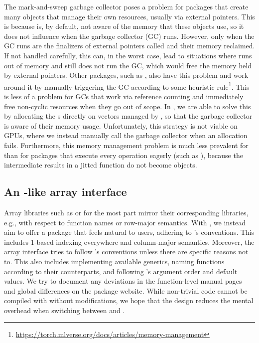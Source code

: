 \documentclass[article,shortnames]{jss}
\begin{document}
The mark-and-sweep  garbage collector poses a problem for  packages that create many objects that manage their own resources, usually via external pointers.
This is because  is, by default, not aware of the memory that these objects use, so it does not influence when the garbage collector (GC) runs.
However, only when the GC runs are the finalizers of external pointers called and their memory reclaimed.
If not handled carefully, this can, in the worst case, lead to situations where  runs out of memory and still does not run the GC, which would free the memory held by external pointers.
Other packages, such as , also have this problem and work around it by manually triggering the GC according to some heuristic rule\footnote{\url{https://torch.mlverse.org/docs/articles/memory-management}}.
This is less of a problem for GCs that work via reference counting and immediately free non-cyclic resources when they go out of scope.
In , we are able to solve this by allocating the s directly on  vectors managed by , so that the garbage collector is aware of their memory usage.
Unfortunately, this strategy is not viable on GPUs, where we instead manually call the  garbage collector when an allocation fails.
Furthermore, this memory management problem is much less prevalent for  than for packages that execute every operation eagerly (such as ), because the intermediate results in a jitted function do not become  objects.

\subsection[An R-like array interface]{An -like array interface}\label{rapi}

Array libraries such as  or  for the most part mirror their corresponding  libraries, e.g., with respect to function names or row-major semantics.
With , we instead aim to offer a package that feels natural to  users, adhering to 's conventions.
This includes 1-based indexing everywhere and column-major semantics.
Moreover, the array interface tries to follow 's conventions unless there are specific reasons not to.
This also includes implementing available generics, naming functions according to their  counterparts, and following 's argument order and default values.
We try to document any deviations in the function-level manual pages and global differences on the package website.
While non-trivial  code cannot be compiled with  without modifications, we hope that the design reduces the mental overhead when switching between   and .
\end{document}
